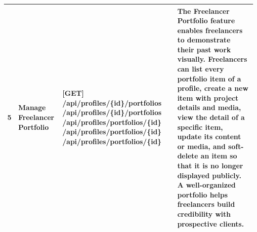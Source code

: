 \begin{longtable}{|C{0.7cm}|L{2.6cm}|S{6.6cm}|L{5.2cm}|}
5
&
\textbf{Manage Freelancer Portfolio}
&
[GET] /\allowbreak{}api/\allowbreak{}profiles/\allowbreak{}\{id\}/\allowbreak{}portfolios \newline
[POST] /\allowbreak{}api/\allowbreak{}profiles/\allowbreak{}\{id\}/\allowbreak{}portfolios \newline
[GET] /\allowbreak{}api/\allowbreak{}profiles/\allowbreak{}portfolios/\allowbreak{}\{id\} \newline
[PUT] /\allowbreak{}api/\allowbreak{}profiles/\allowbreak{}portfolios/\allowbreak{}\{id\} \newline
[DELETE] /\allowbreak{}api/\allowbreak{}profiles/\allowbreak{}portfolios/\allowbreak{}\{id\}
&
The Freelancer Portfolio feature enables freelancers to demonstrate their past work visually. Freelancers can list every portfolio item of a profile, create a new item with project details and media, view the detail of a specific item, update its content or media, and soft-delete an item so that it is no longer displayed publicly. A well-organized portfolio helps freelancers build credibility with prospective clients.
\\ \hline


\end{longtable}
